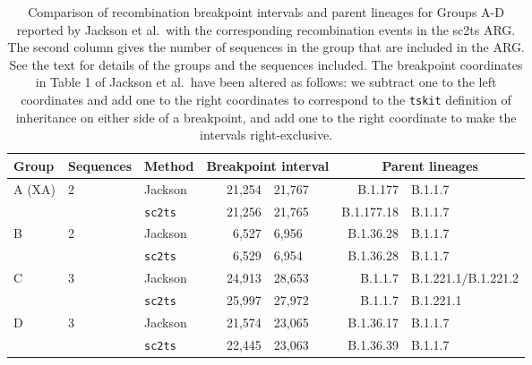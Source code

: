\documentclass[12pt]{article}
\begin{document}
\begin{table}
\centering
\caption{
Comparison of recombination breakpoint
intervals and parent lineages for Groups A-D
reported by Jackson et al.\ with the corresponding
recombination events in the sc2ts ARG.
The second column gives the number of sequences in the group
that are included in the ARG.
See the text for details of the groups and the sequences included.
The breakpoint coordinates in Table 1 of Jackson et al.\ have been altered as follows:
we subtract one to the left coordinates and add one to the right coordinates
to correspond to the \texttt{tskit} definition of inheritance on either side of a breakpoint,
and add one to the right coordinate to make the intervals right-exclusive.
}
\label{tab:jackson}
\begin{tabular}{lllr@{--}lr@{+}l}
\toprule
Group & Sequences & Method & \multicolumn{2}{c}{Breakpoint interval} & \multicolumn{2}{c}{Parent lineages} \\
\midrule
A (XA)       & 2   & Jackson        &  21,254&21,767 & B.1.177&B.1.1.7 \\
             &     &\texttt{sc2ts} &  21,256&21,765 & B.1.177.18&B.1.1.7 \\
\cmidrule{3-7}
B            & 2   & Jackson        &  6,527&6,956 & B.1.36.28&B.1.1.7  \\
             &     &\texttt{sc2ts} &   6,529&6,954 & B.1.36.28&B.1.1.7  \\
\cmidrule{3-7}
C            & 3   &Jackson         &  24,913&28,653 &  B.1.1.7&B.1.221.1/B.1.221.2 \\
             &     &\texttt{sc2ts} &  25,997&27,972 &  B.1.1.7&B.1.221.1 \\
\cmidrule{3-7}
D            & 3   & Jackson        &  21,574&23,065 &  B.1.36.17&B.1.1.7 \\
             &     &\texttt{sc2ts} &  22,445&23,063 &  B.1.36.39&B.1.1.7 \\
\bottomrule
\end{tabular}
\end{table}
\end{document}
